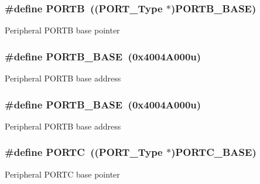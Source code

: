 \subsubsection[{\texorpdfstring{P\+O\+R\+TB}{PORTB}}]{\setlength{\rightskip}{0pt plus 5cm}\#define P\+O\+R\+TB~(({\bf P\+O\+R\+T\+\_\+\+Type} $\ast$){\bf P\+O\+R\+T\+B\+\_\+\+B\+A\+SE})}\hypertarget{group__PORT__Peripheral__Access__Layer_ga09a0c85cd3da09d9cdf63a5ac4c39f77}{}\label{group__PORT__Peripheral__Access__Layer_ga09a0c85cd3da09d9cdf63a5ac4c39f77}
Peripheral P\+O\+R\+TB base pointer 
\subsubsection[{\texorpdfstring{P\+O\+R\+T\+B\+\_\+\+B\+A\+SE}{PORTB_BASE}}]{\setlength{\rightskip}{0pt plus 5cm}\#define P\+O\+R\+T\+B\+\_\+\+B\+A\+SE~(0x4004\+A000u)}\hypertarget{group__PORT__Peripheral__Access__Layer_ga2a668049a5e6c09cf6a7164ffca38a7e}{}\label{group__PORT__Peripheral__Access__Layer_ga2a668049a5e6c09cf6a7164ffca38a7e}
Peripheral P\+O\+R\+TB base address 
\subsubsection[{\texorpdfstring{P\+O\+R\+T\+B\+\_\+\+B\+A\+SE}{PORTB_BASE}}]{\setlength{\rightskip}{0pt plus 5cm}\#define P\+O\+R\+T\+B\+\_\+\+B\+A\+SE~(0x4004\+A000u)}\hypertarget{group__PORT__Peripheral__Access__Layer_ga2a668049a5e6c09cf6a7164ffca38a7e}{}\label{group__PORT__Peripheral__Access__Layer_ga2a668049a5e6c09cf6a7164ffca38a7e}
Peripheral P\+O\+R\+TB base address 
\subsubsection[{\texorpdfstring{P\+O\+R\+TC}{PORTC}}]{\setlength{\rightskip}{0pt plus 5cm}\#define P\+O\+R\+TC~(({\bf P\+O\+R\+T\+\_\+\+Type} $\ast$){\bf P\+O\+R\+T\+C\+\_\+\+B\+A\+SE})}\hypertarget{group__PORT__Peripheral__Access__Layer_ga68fea88642279a70246e026e7221b0a5}{}\label{group__PORT__Peripheral__Access__Layer_ga68fea88642279a70246e026e7221b0a5}
Peripheral P\+O\+R\+TC base pointer 
